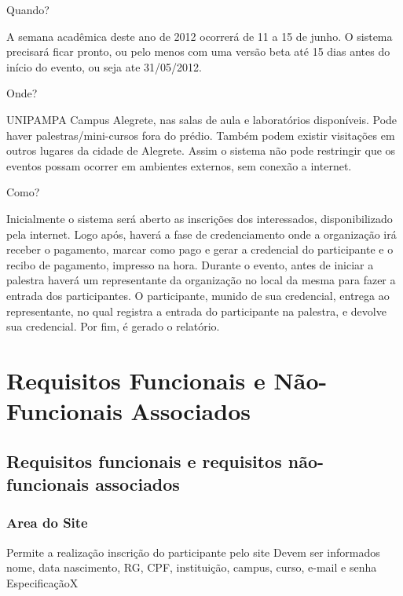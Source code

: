 \documentclass[12pt,a4paper]{article}
\begin{document}
\begin{onehalfspace}
        Quando?
        
        A semana acadêmica deste ano de 2012 ocorrerá de 11 a 15 de junho. O sistema precisará ficar pronto, ou pelo menos com uma versão beta até 15 dias antes do início do evento, ou seja ate 31/05/2012.
        
        Onde?
        
        UNIPAMPA Campus Alegrete, nas salas de aula e laboratórios disponíveis. Pode haver palestras/mini-cursos fora do prédio. Também podem existir visitações em outros lugares da cidade de Alegrete. Assim o sistema não pode restringir que os eventos possam ocorrer em ambientes externos, sem conexão a internet.
        
        Como?
        
        Inicialmente o sistema será aberto as inscrições dos interessados, disponibilizado pela internet. Logo após, haverá a fase de credenciamento onde a organização irá receber o pagamento, marcar como pago e gerar a credencial do participante e o recibo de pagamento, impresso na hora. Durante o evento, antes de iniciar a palestra haverá um representante da organização no local da mesma para fazer a entrada dos participantes. O participante, munido de sua credencial, entrega ao representante, no qual registra a entrada do participante na palestra, e devolve sua credencial. Por fim, é gerado o relatório.
        \end{onehalfspace}
        \clearpage
        \section{Requisitos Funcionais e Não-Funcionais Associados}
        
        	\subsection{Requisitos funcionais e requisitos não-funcionais associados}
        
			
			
			

			\setcounter{NumberReqF}{0}
			\setcounter{NumberReqNF}{0}
			
			\subsubsection{Area do Site}
        	
				{Permite a realização inscrição do participante pelo site}
				{%
					  {Devem ser informados nome, data nascimento, RG, CPF, instituição, campus, curso, e-mail e senha}
					  {Especificação}{}{X}%
				}
				
\end{document}
